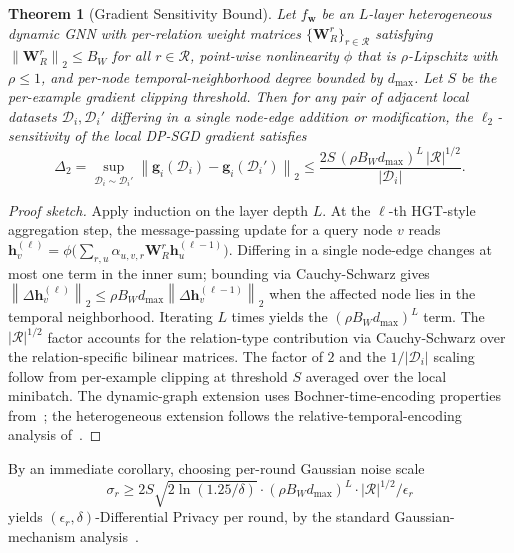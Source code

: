 \documentclass[12pt,a4paper]{article}
\newtheorem{theorem}{Theorem}
\theoremstyle{definition}
\theoremstyle{remark}
\newcommand{\Dcal}{\mathcal{D}}
\newcommand{\Rcal}{\mathcal{R}}
\newcommand{\norm}[1]{\left\|#1\right\|}
\begin{document}
\begin{theorem}[Gradient Sensitivity Bound]
\label{thm:sensitivity}
Let $f_{\mathbf{w}}$ be an $L$-layer heterogeneous dynamic GNN with per-relation weight matrices $\{\mathbf{W}_R^r\}_{r \in \Rcal}$ satisfying $\norm{\mathbf{W}_R^r}_2 \leq B_W$ for all $r \in \Rcal$, point-wise nonlinearity $\phi$ that is $\rho$-Lipschitz with $\rho \leq 1$, and per-node temporal-neighborhood degree bounded by $d_{\max}$. Let $S$ be the per-example gradient clipping threshold. Then for any pair of adjacent local datasets $\Dcal_i, \Dcal_i'$ differing in a single node-edge addition or modification, the $\ell_2$-sensitivity of the local DP-SGD gradient satisfies
\begin{equation}
    \Delta_2 = \sup_{\Dcal_i \sim \Dcal_i'} \norm{\mathbf{g}_i(\Dcal_i) - \mathbf{g}_i(\Dcal_i')}_2 \leq \frac{2 S \, (\rho B_W d_{\max})^L \, |\Rcal|^{1/2}}{|\Dcal_i|}.
\label{eq:sensitivity}
\end{equation}
\end{theorem}

\begin{proof}[Proof sketch]
Apply induction on the layer depth $L$. At the $\ell$-th HGT-style aggregation step, the message-passing update for a query node $v$ reads $\mathbf{h}_v^{(\ell)} = \phi\bigl(\sum_{r, u} \alpha_{u,v,r} \mathbf{W}_R^r \mathbf{h}_u^{(\ell-1)}\bigr)$. Differing in a single node-edge changes at most one term in the inner sum; bounding via Cauchy-Schwarz gives $\norm{\Delta \mathbf{h}_v^{(\ell)}}_2 \leq \rho B_W d_{\max} \norm{\Delta \mathbf{h}_v^{(\ell-1)}}_2$ when the affected node lies in the temporal neighborhood. Iterating $L$ times yields the $(\rho B_W d_{\max})^L$ term. The $|\Rcal|^{1/2}$ factor accounts for the relation-type contribution via Cauchy-Schwarz over the relation-specific bilinear matrices. The factor of $2$ and the $1/|\Dcal_i|$ scaling follow from per-example clipping at threshold $S$ averaged over the local minibatch. The dynamic-graph extension uses Bochner-time-encoding properties from~\cite{xu2020tgat,yu2023dygformer}; the heterogeneous extension follows the relative-temporal-encoding analysis of~\cite{hu2020hgt}.
\end{proof}

By an immediate corollary, choosing per-round Gaussian noise scale
\begin{equation}
    \sigma_r \geq 2 S \sqrt{2 \ln(1.25/\delta)} \cdot (\rho B_W d_{\max})^L \cdot |\Rcal|^{1/2} / \epsilon_r
\end{equation}
yields $(\epsilon_r, \delta)$-Differential Privacy per round, by the standard Gaussian-mechanism analysis~\cite{abadi2016deep,mironov2017renyi}.
\end{document}
